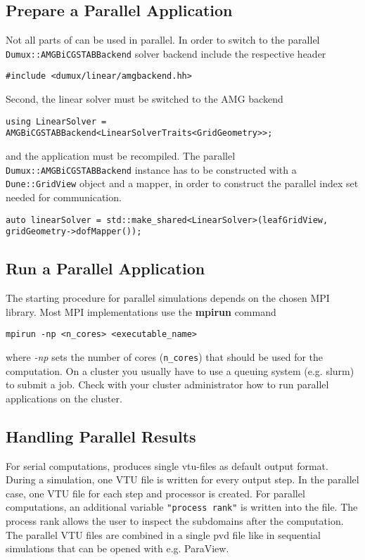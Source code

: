 \subsection{Prepare a Parallel Application}
Not all parts of \Dumux can be used in parallel. In order to switch to the parallel \texttt{Dumux::AMGBiCGSTABBackend}
solver backend include the respective header

\begin{lstlisting}[style=DumuxCode]
#include <dumux/linear/amgbackend.hh>
\end{lstlisting}

Second, the linear solver must be switched to the AMG backend

\begin{lstlisting}[style=DumuxCode]
using LinearSolver = AMGBiCGSTABBackend<LinearSolverTraits<GridGeometry>>;
\end{lstlisting}

and the application must be recompiled. The parallel \texttt{Dumux::AMGBiCGSTABBackend} instance has to be
constructed with a \texttt{Dune::GridView} object and a mapper, in order to construct the
parallel index set needed for communication.

\begin{lstlisting}[style=DumuxCode]
auto linearSolver = std::make_shared<LinearSolver>(leafGridView, gridGeometry->dofMapper());
\end{lstlisting}

\subsection{Run a Parallel Application}
The starting procedure for parallel simulations depends on the chosen MPI library.
Most MPI implementations use the \textbf{mpirun} command

\begin{lstlisting}[style=Bash]
mpirun -np <n_cores> <executable_name>
\end{lstlisting}
%
where \textit{-np} sets the number of cores (\texttt{n\_cores}) that should be used for the
computation. On a cluster you usually have to use a queuing system (e.g. slurm) to
submit a job. Check with your cluster administrator how to run parallel applications on the cluster.

\subsection{Handling Parallel Results}
For serial computations, \Dumux produces single vtu-files as default output format.
During a simulation, one VTU file is written for every output step.
In the parallel case, one VTU file for each step and processor is created.
For parallel computations, an additional variable \texttt{"process rank"} is written
into the file. The process rank allows the user to inspect the subdomains
after the computation. The parallel VTU files are combined in a single pvd file
like in sequential simulations that can be opened with e.g. ParaView.
